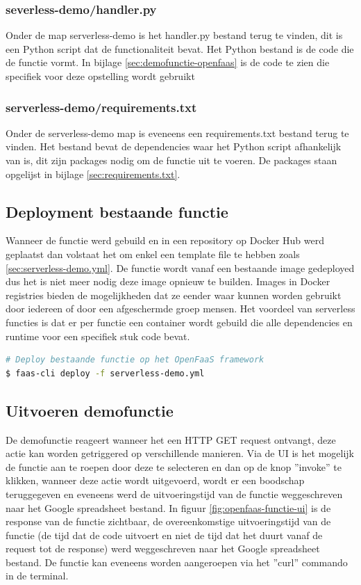 \subsubsection{severless-demo/handler.py}
Onder de map serverless-demo is het handler.py bestand terug te vinden, dit is een Python script dat de functionaliteit bevat. Het Python bestand is de code die de functie vormt. In bijlage \ref{sec:demofunctie-openfaas} is de code te zien die specifiek voor deze opstelling wordt gebruikt

\subsubsection{serverless-demo/requirements.txt}
Onder de serverless-demo map is eveneens een requirements.txt bestand terug te vinden. Het bestand bevat de dependencies waar het Python script afhankelijk van is, dit zijn packages nodig om de functie uit te voeren. De packages staan opgelijst in bijlage \ref{sec:requirements.txt}.

\subsection{Deployment bestaande functie}
Wanneer de functie werd gebuild en in een repository op Docker Hub werd geplaatst dan volstaat het om enkel een template file te hebben zoals \ref{sec:serverless-demo.yml}. De functie wordt vanaf een bestaande image gedeployed dus het is niet meer nodig deze image opnieuw te builden. Images in Docker registries bieden de mogelijkheden dat ze eender waar kunnen worden gebruikt door iedereen of door een afgeschermde groep mensen. Het voordeel van serverless functies is dat er per functie een container wordt gebuild die alle dependencies en runtime voor een specifiek stuk code bevat.

\begin{lstlisting}[language=bash]
# Deploy bestaande functie op het OpenFaaS framework
$ faas-cli deploy -f serverless-demo.yml
\end{lstlisting}

\subsection{Uitvoeren demofunctie}
\label{sec:openfaas-uitvoeren-functie}
De demofunctie reageert wanneer het een HTTP GET request ontvangt, deze actie kan worden getriggered op verschillende manieren. Via de UI is het mogelijk de functie aan te roepen door deze te selecteren en dan op de knop ''invoke'' te klikken, wanneer deze actie wordt uitgevoerd, wordt er een boodschap teruggegeven en eveneens werd de uitvoeringstijd van de functie weggeschreven naar het Google spreadsheet bestand. In figuur \ref{fig:openfaas-functie-ui} is de response van de functie zichtbaar, de overeenkomstige uitvoeringstijd van de functie (de tijd dat de code uitvoert en niet de tijd dat het duurt vanaf de request tot de response) werd weggeschreven naar het Google spreadsheet bestand.
De functie kan eveneens worden aangeroepen via het ''curl'' commando in de terminal.

